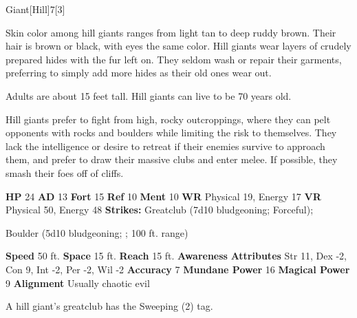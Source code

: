   \begin{monsection}{Giant}[Hill]{7}[3]
    \vspace{-1em}\vspace{-1em}
    \vspace{0em}

    
      Skin color among hill giants ranges from light tan to deep ruddy brown. Their hair is brown or black, with eyes the same color. Hill giants wear layers of crudely prepared hides with the fur left on. They seldom wash or repair their garments, preferring to simply add more hides as their old ones wear out.

      Adults are about 15 feet tall. Hill giants can live to be 70 years old.
    
      Hill giants prefer to fight from high, rocky outcroppings, where they can pelt opponents with rocks and boulders while limiting the risk to themselves.
      They lack the intelligence or desire to retreat if their enemies survive to approach them, and prefer to draw their massive clubs and enter melee.
      If possible, they smash their foes off of cliffs.
    

    \begin{spellcontent}
      \begin{spelltargetinginfo}
        \pari \textbf{HP} 24 \monsep
          \textbf{AD} 13 \monsep
          \textbf{Fort} 15 \monsep
          \textbf{Ref} 10 \monsep
          \textbf{Ment} 10
        \pari \textbf{WR} Physical 19, Energy 17 \monsep
        \textbf{VR} Physical 50, Energy 48
        \pari \textbf{Strikes:}
            Greatclub  (7d10 bludgeoning; Forceful);
\par Boulder  (5d10 bludgeoning; ; 100 ft. range)
      \end{spelltargetinginfo}
    \end{spellcontent}
    \begin{monsterfooter}
      \pari \textbf{Speed} 50 ft. \monsep
        \textbf{Space} 15 ft. \monsep
        \textbf{Reach} 15 ft.
      \pari \textbf{Awareness} 
      \pari \textbf{Attributes}
        Str 11, Dex -2,
        Con 9, Int -2,
        Per -2, Wil -2
      \pari \textbf{Accuracy} 7 \monsep
        \textbf{Mundane Power} 16 \monsep
      \textbf{Magical Power} 9
      \pari \textbf{Alignment} Usually chaotic evil
    \end{monsterfooter}
  \end{monsection}
   A hill giant's greatclub has the Sweeping (2) tag.
  
